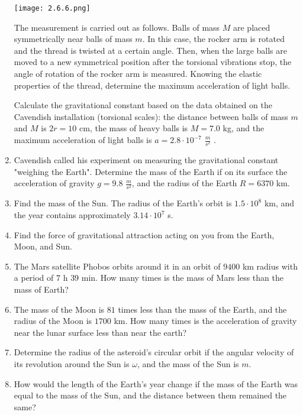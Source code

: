 \documentclass{article}
\begin{document}
\begin{enumerate}[label=2.6.\arabic*]
\begin{center}
    \texttt{[image: 2.6.6.png]}
\end{center}

The measurement is carried out as follows. Balls of mass $M$ are placed symmetrically near balls of mass $m$. In this case, the rocker arm is rotated and the thread is twisted at a certain angle. Then, when the large balls are moved to a new symmetrical position after the torsional vibrations stop, the angle of rotation of the rocker arm is measured. Knowing the elastic properties of the thread, determine the maximum acceleration of light balls. 

Calculate the gravitational constant based on the data obtained on the Cavendish installation (torsional scales): the distance between balls of mass $m$ and $M$ is $2r = 10$ cm, the mass of heavy balls is $M = 7.0$ kg, and the maximum acceleration of light balls is $a = 2.8 \cdot 10^{-7}$ $\frac{m}{s^2}$ .

\item Cavendish called his experiment on measuring the gravitational constant "weighing the Earth". Determine the mass of the Earth if on its surface the acceleration of gravity $g = 9.8$ $\frac{m}{s^2}$, and the radius of the Earth $R = 6370$ km.

\item Find the mass of the Sun. The radius of the Earth's orbit is $1.5 \cdot 10^8$ km, and the year contains approximately $3.14 \cdot 10^7$ s.

\item Find the force of gravitational attraction acting on you from the Earth, Moon, and Sun.

\item The Mars satellite Phobos orbits around it in an orbit of $9400$ km radius with a period of $7$ h $39$ min. How many times is the mass of Mars less than the mass of Earth?

\item The mass of the Moon is $81$ times less than the mass of the Earth, and the radius of the Moon is $1700$ km. How many times is the acceleration of gravity near the lunar surface less than near the earth?

\item Determine the radius of the asteroid's circular orbit if the angular velocity of its revolution around the Sun is $\omega$, and the mass of the Sun is $m$.

\item How would the length of the Earth's year change if the mass of the Earth was equal to the mass of the Sun, and the distance between them remained the same?


\end{enumerate}
\end{document}
